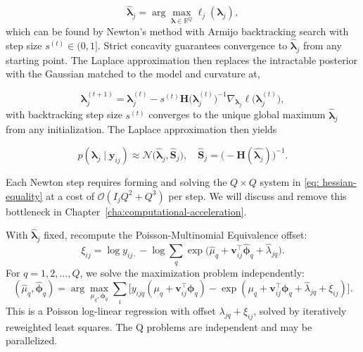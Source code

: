 \begin{equation}
     \hat{\bm{\lambda}}_{j}
     = \arg\max_{\bm{\lambda}\in \mathbb{R}^{Q}}
     \ell_{j}(\bm{\lambda}_{j}),
     \label{eq:maximizer}
\end{equation}
which can be found by Newton's method with Armijo backtracking search with step size $s^{(t)}\in (0,1]$. Strict concavity guarantees convergence to $\hat{\bm{\lambda}}_{j}$ from any starting point. The Laplace approximation then replaces the intractable posterior with the Gaussian matched to the model and curvature at,

\begin{equation}
    \bm{\lambda}_{j}^{(t+1)}=
    \bm{\lambda}_{j}^{(t)}
    -s^{(t)}\mathbf{H}\bigl(\bm{\lambda}_{j}^{(t)}
    \bigr)^{-1}\nabla_{\bm{\lambda}_{j}}
    \ell \bigl(\bm{\lambda}_{j}^{(t)}\bigr),
    \label{eq:newton-method}
\end{equation}
with backtracking step size $s^{(t)}$ converges to the unique global maximum $\hat{\bm{\lambda}}_{j}$ from any initialization. The Laplace approximation then yields

\begin{equation}
    p(\bm{\lambda}_{j}\mid \bm{y}_{ij}) \approx \mathcal{N}\bigl(\hat{\bm{\lambda}}_{j}, \hat{\mathbf{S}}_{j}\bigr), \quad \hat{\mathbf{S}}_{j}=\bigl(-\mathbf{H}(\hat{\bm{\lambda}_{j}})\bigr)^{-1}.
    \label{eq:surrogate-eq}
\end{equation}

Each Newton step requires forming and solving the $Q\times Q$ system in \eqref{eq: hessian-equality} at a cost of $\mathcal{O}(I_{j}Q^{2}+Q^{3})$ per step. We will discuss and remove this bottleneck in Chapter~\ref{cha:computational-acceleration}.


With $\hat{\bm{\lambda}}_{j}$ fixed, recompute the Poisson-Multinomial Equivalence offset:
\begin{equation}
    \xi_{ij}=\log y_{ij\cdot}-\log \sum_{q}\exp\bigl(\hat{\mu}_{q}+\bm{v}_{ij}^{\top}\hat{\bm{\phi}}_{q}+\hat{\lambda}_{jq}\bigr).
\end{equation}
For $q=1,2,\dots,Q$, we solve the maximization problem independently:
\begin{equation}
    (\hat{\mu}_{q}, \hat{\bm{\phi}}_{q})=\arg \max_{\mu_{q}, \bm{\phi}_{q}}\sum_{i}\bigl[y_{ijq}(\mu_{q}+\bm{v}_{ij}^{\top}\bm{\phi}_{q})-\exp (\mu_{q}+\bm{v}_{ij}^{\top}\bm{\phi}_{q}+\hat{\lambda}_{jq}+\xi_{ij})\bigr].
\end{equation}
This is a Poisson log-linear regression with offset $\lambda_{jq}+\xi_{ij}$, solved by iteratively reweighted least squares. The Q problems are independent and may be parallelized. 

